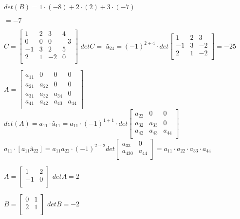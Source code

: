 \documentclass{article}
\begin{document}
$det(B) = 1 \cdot (-8) + 2 \cdot (2) + 3\cdot (-7)$

$= -7$

\bigbreak

$C = \begin{bmatrix}
    1 & 2 & 3 & 4 \\
    0 & 0 & 0 & -3 \\
    -1 & 3 & 2 & 5 \\
    2 & 1 & -2 & 0 \\
\end{bmatrix}$
\bigbreak
$det C =$ \bigbreak
$ã_{24} = (-1)^{2+4} \cdot det \begin{bmatrix}
    1 & 2 & 3 \\
    -1 & 3 & -2 \\
    2 & 1 & -2 \\
\end{bmatrix} = -25$

\bigbreak

$A = \begin{bmatrix}
    a_{11} & 0 & 0 & 0 \\
    a_{21} & a_{22} & 0 & 0 \\
    a_{31} & a_{32} & a_{34} & 0 \\
    a_{41} & a_{42} & a_{43} & a_{44} \\
\end{bmatrix}$
\bigbreak
$det(A) = a_{11} \cdot ã_{11} = a_{11} \cdot (-1)^{1+1} \cdot det \begin{bmatrix}
    a_{22} & 0 & 0 \\
    a_{32} & a_{33} & 0 \\
    a_{42} & a_{43} & a_{44} \\
\end{bmatrix}$
\bigbreak
$a_{11} \cdot [a_{11} ã_{22}] = a_{11} a_{22} \cdot (-1)^{2+2} det \begin{bmatrix}
    a_{33} & 0 \\
    a_{430} & a_{44} \\
\end{bmatrix} = a_{11}\cdot a_{22}\cdot a_{33}\cdot a_{44}$

\bigbreak

$A = \begin{bmatrix}
    1 & 2 \\
    -1 & 0 \\
\end{bmatrix}
$ \bigbreak $det A = 2$

$B = \begin{bmatrix}
    0 & 1 \\
    2 & 1 \\
\end{bmatrix}
$
\bigbreak $det B = -2$
\end{document}
